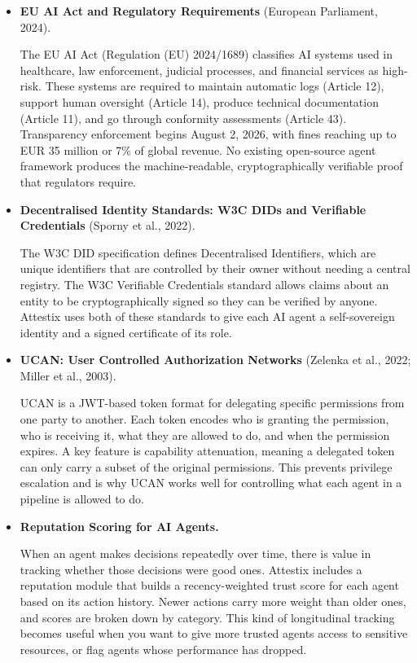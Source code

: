 \begin{itemize}
\item \textbf{EU AI Act and Regulatory Requirements} (European Parliament, 2024).

The EU AI Act (Regulation (EU) 2024/1689) classifies AI systems used in healthcare, law enforcement, judicial processes, and financial services as high-risk. These systems are required to maintain automatic logs (Article 12), support human oversight (Article 14), produce technical documentation (Article 11), and go through conformity assessments (Article 43). Transparency enforcement begins August 2, 2026, with fines reaching up to EUR 35 million or 7\% of global revenue. No existing open-source agent framework produces the machine-readable, cryptographically verifiable proof that regulators require.

\item \textbf{Decentralised Identity Standards: W3C DIDs and Verifiable Credentials} (Sporny et al., 2022).

The W3C DID specification defines Decentralised Identifiers, which are unique identifiers that are controlled by their owner without needing a central registry. The W3C Verifiable Credentials standard allows claims about an entity to be cryptographically signed so they can be verified by anyone. Attestix uses both of these standards to give each AI agent a self-sovereign identity and a signed certificate of its role.

\item \textbf{UCAN: User Controlled Authorization Networks} (Zelenka et al., 2022; Miller et al., 2003).

UCAN is a JWT-based token format for delegating specific permissions from one party to another. Each token encodes who is granting the permission, who is receiving it, what they are allowed to do, and when the permission expires. A key feature is capability attenuation, meaning a delegated token can only carry a subset of the original permissions. This prevents privilege escalation and is why UCAN works well for controlling what each agent in a pipeline is allowed to do.

\item \textbf{Reputation Scoring for AI Agents.}

When an agent makes decisions repeatedly over time, there is value in tracking whether those decisions were good ones. Attestix includes a reputation module that builds a recency-weighted trust score for each agent based on its action history. Newer actions carry more weight than older ones, and scores are broken down by category. This kind of longitudinal tracking becomes useful when you want to give more trusted agents access to sensitive resources, or flag agents whose performance has dropped.


\end{itemize}
